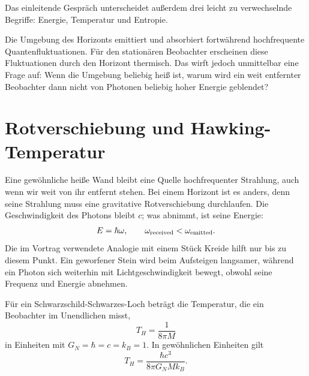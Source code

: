 Das einleitende Gespräch unterscheidet außerdem drei leicht zu verwechselnde Begriffe: Energie, Temperatur und Entropie.

\begin{classroomqa}
\end{classroomqa}


Die Umgebung des Horizonts emittiert und absorbiert fortwährend hochfrequente Quantenfluktuationen. Für den stationären Beobachter erscheinen diese Fluktuationen durch den Horizont thermisch. Das wirft jedoch unmittelbar eine Frage auf: Wenn die Umgebung beliebig heiß ist, warum wird ein weit entfernter Beobachter dann nicht von Photonen beliebig hoher Energie geblendet?

\section{Rotverschiebung und Hawking-Temperatur}

Eine gewöhnliche heiße Wand bleibt eine Quelle hochfrequenter Strahlung, auch wenn wir weit von ihr entfernt stehen. Bei einem Horizont ist es anders, denn seine Strahlung muss eine gravitative Rotverschiebung durchlaufen. Die Geschwindigkeit des Photons bleibt \(c\); was abnimmt, ist seine Energie:
\begin{equation}
E=\hbar\omega,
\qquad
\omega_{\rm received}<\omega_{\rm emitted}.
\end{equation}
Die im Vortrag verwendete Analogie mit einem Stück Kreide hilft nur bis zu diesem Punkt. Ein geworfener Stein wird beim Aufsteigen langsamer, während ein Photon sich weiterhin mit Lichtgeschwindigkeit bewegt, obwohl seine Frequenz und Energie abnehmen.

Für ein Schwarzschild-Schwarzes-Loch beträgt die Temperatur, die ein Beobachter im Unendlichen misst,
\begin{equation}
T_H=\frac{1}{8\pi M}
\label{eq:l09-hawking-natural}
\end{equation}
in Einheiten mit \(G_N=\hbar=c=k_B=1\). In gewöhnlichen Einheiten gilt
\begin{equation}
T_H=\frac{\hbar c^3}{8\pi G_N M k_B}.
\label{eq:l09-hawking-full}
\end{equation}

